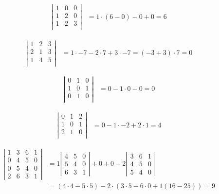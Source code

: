 \documentclass[a4paper,norsk,12pt]{article}
\begin{document}
\begin{align*}
  \left|
    \begin{array}{ccc}
      1 & 0 & 0 \\
      1 & 2 & 0 \\
      1 & 2 & 3 \\
    \end{array}
  \right|
  &= 1\cdot(6-0) - 0 + 0 = 6
\end{align*}

\begin{align*}
  \left|
    \begin{array}{ccc}
      1 & 2 & 3 \\
      2 & 1 & 3 \\
      1 & 4 & 5 \\
    \end{array}
  \right|
  &= 1\cdot-7 -2\cdot7 + 3\cdot-7
  = (-3+3)\cdot7=0
\end{align*}

\begin{align*}
  \left|
    \begin{array}{ccc}
      0 & 1 & 0 \\
      1 & 0 & 1 \\
      0 & 1 & 0 \\
    \end{array}
  \right|
  &= 0-1\cdot0-0=0
\end{align*}

\begin{align*}
  \left|
    \begin{array}{ccc}
      0 & 1 & 2 \\
      1 & 0 & 1 \\
      2 & 1 & 0 \\
    \end{array}
  \right|
  &= 0 -1\cdot-2 +2\cdot1 = 4
\end{align*}

\begin{align*}
  \left|
    \begin{array}{cccc}
      1 & 3 & 6 & 1 \\
      0 & 4 & 5 & 0 \\
      0 & 5 & 4 & 0 \\
      2 & 6 & 3 & 1
    \end{array}
  \right|
  &=
  1\left|
    \begin{array}{ccc}
      4 & 5 & 0 \\
      5 & 4 & 0 \\
      6 & 3 & 1
    \end{array}
  \right|
  + 0 + 0 - 2
  \left|
    \begin{array}{ccc}
      3 & 6 & 1 \\
      4 & 5 & 0 \\
      5 & 4 & 0
    \end{array}
  \right|
  \\
  &=
  (4\cdot4 -5\cdot5) - 2\cdot(3\cdot5-6\cdot0+1(16-25))
  = 9
\end{align*}
\end{document}
